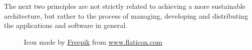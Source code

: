 The next two principles are not strictly related to achieving a more sustainable
architecture, but rather to the process of managing, developing and distributing
the applications and software in general. \\ %

\begin{figure} %
  \centering
  \def\stackalignment{r} %
  {\scriptsize \parbox[t]{\linewidth}{ Icon made by \href{https://www.flaticon.com/authors/freepik}{Freepik} from \href{http://www.flaticon.com}{www.flaticon.com} }}
\end{figure}

